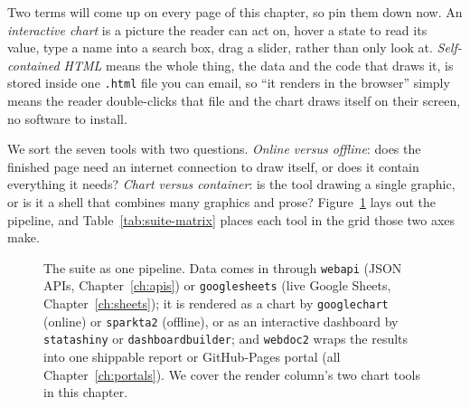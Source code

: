 \documentclass[
    a4paper,
    fontsize=10pt,
    twoside=true,
    numbers=noenddot,
]{kaobook}
\begin{document}
Two terms will come up on every page of this chapter, so pin them down now. An \emph{interactive chart} is a picture the reader can act on, hover a state to read its value, type a name into a search box, drag a slider, rather than only look at. \emph{Self-contained HTML} means the whole thing, the data and the code that draws it, is stored inside one \texttt{.html} file you can email, so \enquote{it renders in the browser} simply means the reader double-clicks that file and the chart draws itself on their screen, no software to install.

We sort the seven tools with two questions. \emph{Online versus offline}: does the finished page need an internet connection to draw itself, or does it contain everything it needs? \emph{Chart versus container}: is the tool drawing a single graphic, or is it a shell that combines many graphics and prose? Figure~\ref{fig:suite-pipeline} lays out the pipeline, and Table~\ref{tab:suite-matrix} places each tool in the grid those two axes make.

\begin{figure}[htbp]
\centering
{}
\caption[The visualization suite pipeline]{The suite as one pipeline. Data comes in through \texttt{webapi} (JSON APIs, Chapter~\ref{ch:apis}) or \texttt{googlesheets} (live Google Sheets, Chapter~\ref{ch:sheets}); it is rendered as a chart by \texttt{googlechart} (online) or \texttt{sparkta2} (offline), or as an interactive dashboard by \texttt{statashiny} or \texttt{dashboardbuilder}; and \texttt{webdoc2} wraps the results into one shippable report or GitHub-Pages portal (all Chapter~\ref{ch:portals}). We cover the render column's two chart tools in this chapter.}
\label{fig:suite-pipeline}
\end{figure}
\end{document}

